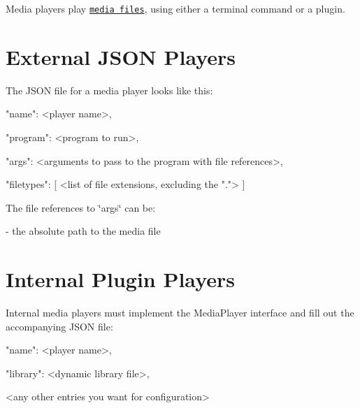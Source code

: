 Media players play \href{../items/README.md>}{\tt media files}, using either a terminal command or a plugin.

\section*{External J\-S\-O\-N Players}

The J\-S\-O\-N file for a media player looks like this\-: \begin{DoxyVerb}{
    "name": <player name>,

    "program": <program to run>,

    "args": <arguments to pass to the program with file references>,

    "filetypes": [
        <list of file extensions, excluding the ".">
    ]
}
\end{DoxyVerb}


The file references to {\ttfamily \char`\"{}args\char`\"{}} can be\-: \begin{DoxyVerb}{1} - the absolute path to the media file
\end{DoxyVerb}


\section*{Internal Plugin Players}

Internal media players must implement the {\ttfamily Media\-Player} interface and fill out the accompanying J\-S\-O\-N file\-: \begin{DoxyVerb}{
    "name": <player name>,

    "library": <dynamic library file>,

    <any other entries you want for configuration>
}
\end{DoxyVerb}
 